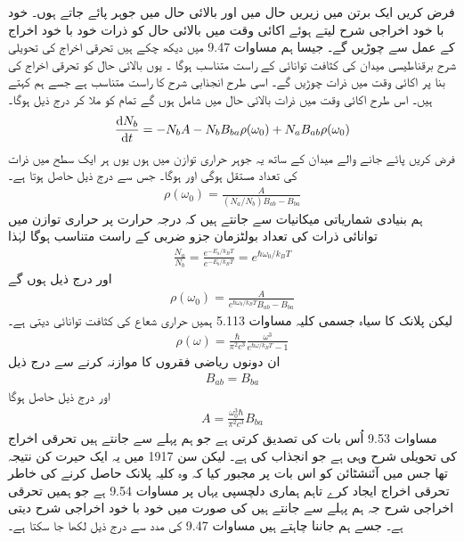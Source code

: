 فرض کریں ایک برتن میں زیریں حال  میں  اور بالائی حال  میں  جوہر پائے جاتے ہوں۔ خود با خود اخراجی شرح  لیتے ہوئے اکائی وقت میں بالائی حال کو  ذرات خود با خود اخراج کے عمل سے چوڑیں گے۔ جیسا ہم مساوات \num{9.47} میں دیکھ چکے ہیں تحرقی اخراج کی تحویلی شرح برقناطیسی میدان کی کثافت توانائی کے راست متناسب ہوگا ۔ یوں بالائی حال کو تحرقی اخراج کی بنا پر اکائی وقت میں  ذرات چوڑیں گے۔ اسی طرح  انجذابی   شرح   کا راست متناسب ہے جسے ہم  کہتے ہیں۔ اس طرح اکائی وقت میں  ذرات بالائی حال میں شامل ہوں گے تمام کو ملا کر درج ذیل ہوگا۔
\begin{align}
	\frac{\dif N_b}{\dif t} = -N_bA-N_bB_{ba}\rho(\omega_0)+N_aB_{ab}\rho(\omega_0)
\end{align}
فرض کریں پائے جانے والے میدان کے ساتھ یہ جوہر حراری توازن میں ہوں یوں ہر ایک سطح میں ذرات کی تعداد مستقل ہوگی اور  ہوگا۔ جس سے درج ذیل حاصل ہوتا ہے۔
\begin{align}
	\rho(\omega_0) = \frac{A}{(N_a/N_b)B_{ab}-B_{ba}}
\end{align}
ہم بنیادی شماریاتی میکانیات سے جانتے ہیں کہ درجہ حرارت  پر حراری توازن میں توانائی  ذرات کی تعداد بولٹزمان جزو  ضربی  کے راست متناسب ہوگا لہٰذا
\begin{align}
	\frac{N_a}{N_b} = \frac{e^{-E_a/k_{B}T}}{e^{-E_b/k_BT}} = e^{\hbar\omega_0/k_BT}
\end{align}
اور درج ذیل ہوں گے
\begin{align}
	\rho(\omega_0) = \frac{A}{e^{\hbar\omega_0/k_BT}B_{ab}-B_{ba}}
\end{align}
لیکن پلانک کا سیاہ جسمی کلیہ مساوات \num{5.113} ہمیں حراری شعاع کی کثافت توانائی دیتی ہے۔
\begin{align}
	\rho(\omega) = \frac{\hbar}{\pi^2c^3}\frac{\omega^3}{e^{\hbar\omega/k_BT}-1}
\end{align}
ان دونوں ریاضی فقروں  کا موازنہ کرنے سے درج ذیل 
\begin{align}
	B_{ab} = B_{ba}
\end{align}
اور درج ذیل حاصل ہوگا
\begin{align}
	A = \frac{\omega^3_0\hbar}{\pi^2c^3}B_{ba}
\end{align}
مساوات \num{9.53} اُس بات کی تصدیق کرتی ہے جو ہم پہلے سے جانتے ہیں تحرقی اخراج کی تحویلی شرح وہی ہے جو انجذاب کی ہے۔ لیکن سن \num{1917} میں یہ ایک حیرت کن نتیجہ تھا جس میں آئنشٹائن کو اس بات پر مجبور کیا کہ وہ کلیہ پلانک حاصل کرنے کی خاطر تحرقی اخراج ایجاد کرے تاہم ہماری دلچسپی یہاں پر مساوات \num{9.54} ہے جو ہمیں تحرقی اخراجی شرح  جہ ہم پہلے سے جانتے ہیں کی صورت میں خود با خود اخراجی شرح  دیتی ہے۔ جسے ہم جاننا چاہتے ہیں مساوات \num{9.47} کی مدد سے درج ذیل لکھا جا سکتا ہے۔
